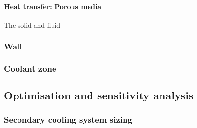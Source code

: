 \paragraph{Heat transfer: Porous media}

The solid and fluid 

\subsubsection{Wall}

\subsubsection{Coolant zone}

\subsection{Optimisation and sensitivity analysis}

\subsubsection{Secondary cooling system sizing}

